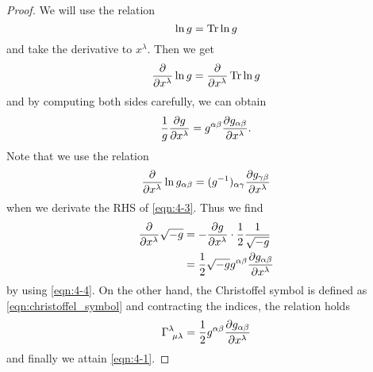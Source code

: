\documentclass[a4paper,pdftex,10pt]{article}
\begin{document}
\begin{proof}
  We will use the relation
  \begin{equation}
    \ln g
    =
    \Tr \ln g
    \label{eqn:4-2}
  \end{equation}
  and take the derivative to $x^{\lambda}$. Then we get
  \begin{equation}
    \pdv{}{x^{\lambda}}\ln g
    =
    \pdv{}{x^{\lambda}}\Tr\ln g
    \label{eqn:4-3}
  \end{equation}
  and by computing both sides carefully, we can obtain
  \begin{equation}
    \frac{1}{g}\pdv{g}{x^{\lambda}}
    =
    g^{\alpha\beta}\pdv{g_{\alpha\beta}}{x^{\lambda}}
    .
    \label{eqn:4-4}
  \end{equation}
  Note that we use the relation
  \begin{equation}
    \pdv{}{x^{\lambda}}\ln g_{\alpha\beta}
    =
    (g^{-1})_{\alpha\gamma}\pdv{g_{\gamma\beta}}{x^{\lambda}}
  \end{equation}
  when we derivate the RHS of \eqref{eqn:4-3}. Thus we find
  \begin{align}
    \pdv{}{x^{\lambda}}\sqrt{-g}
     & =
    -\pdv{g}{x^{\lambda}}
    \cdot
    \frac{1}{2}\frac{1}{\sqrt{-g}}
    \nonumber
    \\
     & =
    \frac{1}{2}\sqrt{-g}g^{\alpha\beta}\pdv{g_{\alpha\beta}}{x^{\lambda}}
  \end{align}
  by using \eqref{eqn:4-4}. On the other hand, the Christoffel symbol is defined as \eqref{eqn:christoffel_symbol} and contracting the indices, the relation holds
  \begin{equation}
    \Gamma^{\lambda}_{\ \mu\lambda}
    =
    \frac{1}{2}g^{\alpha\beta}\pdv{g_{\alpha\beta}}{x^{\lambda}}
  \end{equation}
  and finally we attain \eqref{eqn:4-1}.
\end{proof}




% 
% 

\end{document}
